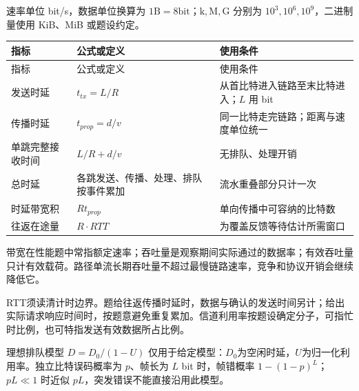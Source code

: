 速率单位 bit/s，数据单位换算为 \(1\mathrm{B}=8\mathrm{bit}\)；\(\mathrm{k},\mathrm{M},\mathrm{G}\) 分别为 \(10^3,10^6,10^9\)，二进制量使用 KiB、MiB 或题设约定。

\par\smallskip
\begin{wideblock}
{\fontsize{9.3}{12}\selectfont\setlength{\tabcolsep}{2.5pt}\setlength{\LTleft}{0pt}\setlength{\LTright}{0pt}
\begin{longtable}{@{}>{\raggedright\arraybackslash}p{}>{\raggedright\arraybackslash}p{}>{\raggedright\arraybackslash}p{}@{}}
\toprule
指标 & 公式或定义 & 使用条件 \\

\midrule\endfirsthead\toprule
指标 & 公式或定义 & 使用条件 \\

\midrule\endhead\bottomrule\endfoot
发送时延 & \(t_{tx}=L/R\) & 从首比特进入链路至末比特进入；\(L\) 用 bit \\

传播时延 & \(t_{prop}=d/v\) & 同一比特走完链路；距离与速度单位统一 \\

单跳完整接收时间 & \(L/R+d/v\) & 无排队、处理开销 \\

总时延 & 各跳发送、传播、处理、排队按事件累加 & 流水重叠部分只计一次 \\

时延带宽积 & \(R t_{prop}\) & 单向传播中可容纳的比特数 \\

往返在途量 & \(R\cdot RTT\) & 为覆盖反馈等待估计所需窗口 \\

\end{longtable}}
\end{wideblock}
\par\smallskip

带宽在性能题中常指额定速率；吞吐量是观察期间实际通过的数据率；有效吞吐量只计有效载荷。路径单流长期吞吐量不超过最慢链路速率，竞争和协议开销会继续降低它。

RTT须读清计时边界。题给往返传播时延时，数据与确认的发送时间另计；给出实际请求响应时间时，按题意避免重复累加。信道利用率按题设确定分子，可指忙时比例，也可特指发送有效数据所占比例。

理想排队模型 \(D=D_0/(1-U)\) 仅用于给定模型：\(D_0\)为空闲时延，\(U\)为归一化利用率。独立比特误码概率为 \(p\)、帧长为 \(L\) bit 时，帧错概率 \(1-(1-p)^L\)；\(pL\ll1\) 时近似 \(pL\)，突发错误不能直接沿用此模型。

